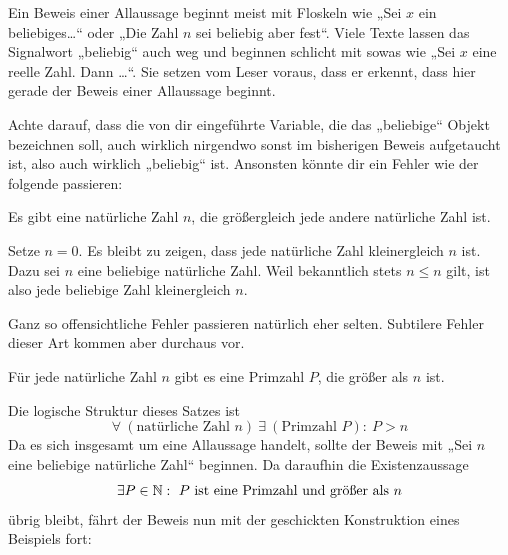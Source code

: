   
\begin{bem}[Signalwörter]
    Ein Beweis einer Allaussage beginnt meist mit Floskeln wie „Sei $x$ ein beliebiges\dots“ oder „Die Zahl $n$ sei beliebig aber fest“. Viele Texte lassen das Signalwort „beliebig“ auch weg und beginnen schlicht mit sowas wie „Sei $x$ eine reelle Zahl. Dann \dots“. Sie setzen vom Leser voraus, dass er erkennt, dass hier gerade der Beweis einer Allaussage beginnt.
\end{bem}
  
 
\begin{bem}[*]
    Achte darauf, dass die von dir eingeführte Variable, die das „beliebige“ Objekt bezeichnen soll, auch wirklich nirgendwo sonst im bisherigen Beweis aufgetaucht ist, also auch wirklich „beliebig“ ist. Ansonsten könnte dir ein Fehler wie der folgende passieren:
    \begin{bsp}[*]
        Es gibt eine natürliche Zahl $n$, die größergleich jede andere natürliche Zahl ist.
    \end{bsp}
    \begin{bew}
        Setze $n=0$. Es bleibt zu zeigen, dass jede natürliche Zahl kleinergleich $n$ ist. Dazu sei $n$ eine beliebige natürliche Zahl. Weil bekanntlich stets $n\le n$ gilt, ist also jede beliebige Zahl kleinergleich $n$.
    \end{bew}
        Ganz so offensichtliche Fehler passieren natürlich eher selten. Subtilere Fehler dieser Art kommen aber durchaus vor.
\end{bem}


\begin{bsp} \label{euklid}
    Für jede natürliche Zahl $n$ gibt es eine Primzahl $P$, die größer als $n$ ist.
\end{bsp}


\begin{bem}
    Die logische Struktur dieses Satzes ist
        \[ \forall\ (\text{natürliche Zahl $n$})\ \exists\ (\text{Primzahl $P$}):\ P>n \]
    Da es sich insgesamt um eine Allaussage handelt, sollte der Beweis mit „Sei $n$ eine beliebige natürliche Zahl“ beginnen. Da daraufhin die Existenzaussage
        \[ \exists P\in \mathbb N:\ \text{$P$ ist eine Primzahl und größer als $n$} \]
    übrig bleibt, fährt der Beweis nun mit der geschickten Konstruktion eines Beispiels fort:
\end{bem}


